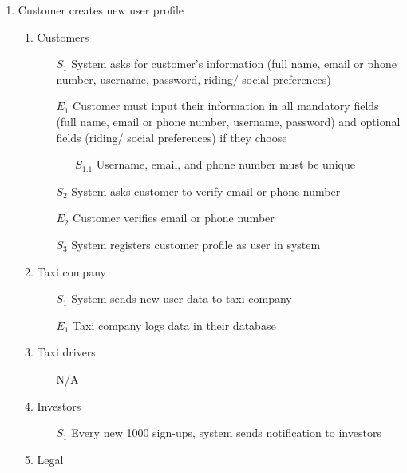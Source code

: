 \documentclass[]{article}
\begin{document}
\begin{enumerate}[{\textbf{BE}}1.]
    \item Customer creates new user profile
    \begin{enumerate}[{\textbf{VP}1}.1]
        \item Customers
            \begin{enumerate}
                \item[$S_1$] System asks for customer’s information (full name, email or phone number, username, password, riding/ social preferences)
                \item[$E_1$] Customer must input their information in all mandatory fields (full name, email or phone number, username, password) and optional fields (riding/ social preferences) if they choose
                \begin{enumerate}
                    \item[$S_{1.1}$] Username, email, and phone number must be unique
                \end{enumerate}
                \item[$S_2$] System asks customer to verify email or phone number
                \item[$E_2$] Customer verifies email or phone number
                \item[$S_3$] System registers customer profile as user in system
            \end{enumerate}
        \item Taxi company
            \begin{enumerate}
                \item[$S_1$] System sends new user data to taxi company
                \item[$E_1$] Taxi company logs data in their database
            \end{enumerate}
        \item Taxi drivers
            \begin{enumerate}
                \item[N/A]
            \end{enumerate}
        \item Investors
            \begin{enumerate}
                \item[$S_1$] Every new 1000 sign-ups, system sends notification to investors
            \end{enumerate}
        \item Legal

\end{enumerate}
\end{enumerate}
\end{document}
